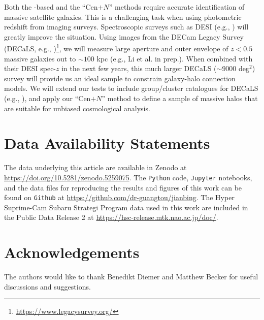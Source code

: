 \documentclass[fleqn,usenatbib,useAMS]{mnras}
\begin{document}
    Both the \mstar{}-based and the ``Cen$+N$'' methods require accurate identification of massive
    satellite galaxies.
    This is a challenging task when using photometric redshift from imaging surveys.  Spectroscopic
    surveys such as DESI (e.g., \citealt{DESI2016}) will greatly improve the situation.
    Using images from the DECam Legacy Survey (DECaLS, e.g., \citealt{Dey2019})\footnote{
        \url{https://www.legacysurvey.org/}
    }, we will measure large aperture and outer envelope \mstar{} of $z<0.5$ massive galaxies 
    out to $\sim 100$ kpc (e.g., Li et al. in prep.).
    When combined with their DESI spec-$z$ in the next few years, this much larger DECaLS ($\sim
    9000$ deg$^2$) survey will provide us an ideal sample to constrain galaxy-halo connection
    models.
    We will extend our \topn{} tests to include group/cluster catalogues for DECaLS (e.g.,
    \citealt{Yang2020, Zou2021}), and apply our ``Cen$+N$'' method to define a sample of massive
    halos that are suitable for unbiased cosmological analysis.
    
\section*{Data Availability Statements}

    The data underlying this article are available in Zenodo at 
    \url{https://doi.org/10.5281/zenodo.5259075}.
    The \texttt{Python} code, \texttt{Jupyter} notebooks, and the data files for reproducing the 
    results and figures of this work can be found on \texttt{Github} at
    \url{https://github.com/dr-guangtou/jianbing}.
    The Hyper Suprime-Cam Subaru Strategi Program data used in this work are included in the 
    Public Data Release 2 at \url{https://hsc-release.mtk.nao.ac.jp/doc/}.

\section*{Acknowledgements}

  The authors would like to thank Benedikt Diemer and Matthew Becker for useful discussions and 
  suggestions.
\end{document}
